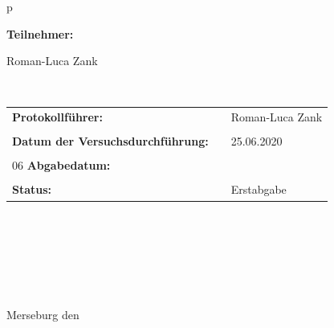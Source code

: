 \begin{center}
\begin{tabular}{p{\textwidth}}
		
		
		\begin{center}
			\Large{\textbf{Teilnehmer:}} \\ 
		\end{center}
		\begin{center}
			\large{Roman-Luca Zank}
		\end{center}
		
		
		\\
		
		\begin{center}
			\begin{tabular}{lll}
				\large{\textbf{Protokollführer:}} & &  \large{Roman-Luca Zank}\\
				&&\\
				\large{\textbf{Datum der Versuchsdurchführung:}}&& \large{25.06.2020}\\
				&&\\
06				\large{\textbf{Abgabedatum:}}&& \large{\todayDE}\\
				&&\\
				\large{\textbf{Status:}}&& \large{Erstabgabe}\\
			\end{tabular}
		\end{center}
		
		\\ \\ \\ \\ \\ \\ 
		\large{Merseburg den \todayDE}
		
	\end{tabular}
\end{center}
